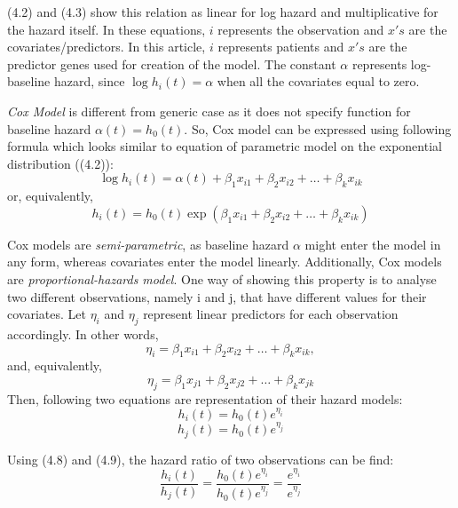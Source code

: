 \documentclass{ba-kecs}
\numberwithin{figure}{section}
\numberwithin{equation}{section}
\begin{document}
(4.2) and (4.3) show this relation as linear for log hazard and multiplicative for the hazard itself. In these equations, $i$ represents the observation and $x's$ are the covariates/predictors. In this article, $i$ represents patients and $x's$ are the predictor genes used for creation of the model. The constant $\alpha$ represents log-baseline hazard, since $\log{h_i(t)} = \alpha$ when all the covariates equal to zero. 

\textit{Cox Model} is different from generic case as it does not specify function for baseline hazard $\alpha(t) = h_{0}(t)$. So, Cox model can be expressed using following formula which looks similar to equation of parametric model on the exponential distribution ((4.2)):
\begin{equation}
\log{h_{i}(t)} = \alpha(t) + \beta_{1}x_{i1} + \beta_{2}x_{i2} + \hdots + \beta_{k}x_{ik}
\end{equation}
or, equivalently,
\begin{equation}
h_{i}(t) = h_{0}(t)\exp(\beta_{1}x_{i1} + \beta_{2}x_{i2} + \hdots + \beta_{k}x_{ik})
\end{equation}

Cox models are \textit{semi-parametric}, as baseline hazard $\alpha$ might enter the model in any form, whereas covariates enter the model linearly. Additionally, Cox models are \textit{proportional-hazards model}. One way of showing this property is to analyse two different observations, namely i and j, that have different values for their covariates. Let $\eta_{i}$ and $\eta_{j}$ represent linear predictors for each observation accordingly. In other words,
\begin{equation}
\eta_{i} = \beta_{1}x_{i1} + \beta_{2}x_{i2} + \hdots + \beta_{k}x_{ik},
\end{equation}
and, equivalently,
\begin{equation}
\eta_{j} = \beta_{1}x_{j1} + \beta_{2}x_{j2} + \hdots + \beta_{k}x_{jk}
\end{equation}
Then, following two equations are representation of their hazard models:
\begin{equation}
h_{i}(t) = h_{0}(t)e^{\eta_{i}}
\end{equation}
\begin{equation}
h_{j}(t) = h_{0}(t)e^{\eta_{j}}
\end{equation}

Using (4.8) and (4.9), the hazard ratio of two observations can be find:
\begin{equation}
\dfrac{h_{i}(t)}{h_{j}(t)} = \dfrac{h_{0}(t)e^{\eta_{i}}}{h_{0}(t)e^{\eta_{j}}} = \dfrac{e^{\eta_{i}}}{e^{\eta_{j}}}
\end{equation}
\end{document}

